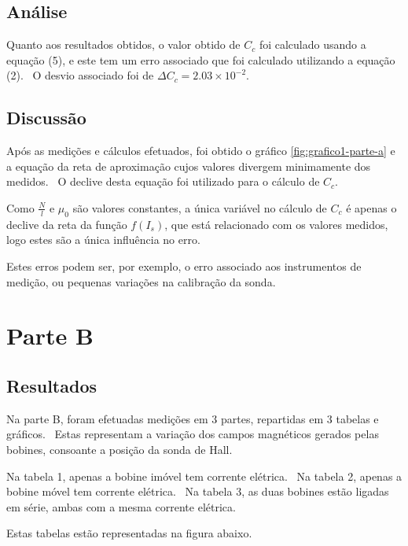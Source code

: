 {\subsection{Análise} \label{subsec:analise-discussao-parte1-analise}
    Quanto aos resultados obtidos, o valor obtido de $C_c$ foi calculado usando a equação (5), e este tem um erro associado que foi calculado utilizando a equação (2). \ O desvio associado foi de $\Delta C_c = 2.03 \times 10^{-2}$.

\subsection{Discussão}
    Após as medições e cálculos efetuados, foi obtido o gráfico \ref{fig:grafico1-parte-a} e a equação da reta de aproximação cujos valores divergem minimamente dos medidos. \ O declive desta equação foi utilizado para o cálculo de $C_c$. 
    \par Como $\frac{N}{l}$ e $\mu_0$ são valores constantes, a única variável no cálculo de $C_c$ é apenas o declive da reta da função $f(I_s)$, que está relacionado com os valores medidos, logo estes são a única influência no erro.
    \par Estes erros podem ser, por exemplo, o erro associado aos instrumentos de medição, ou pequenas variações na calibração da sonda.
    
\pagebreak

\section{Parte B}
\label{sec:analise-discussao-parte2}

\subsection{Resultados}
\label{subsec:analise-discussao-parte2-resultados}
    Na parte B, foram efetuadas medições em 3 partes, repartidas em 3 tabelas e gráficos. \ Estas representam a variação dos campos magnéticos gerados pelas bobines, consoante a posição da sonda de Hall.
    \par Na tabela 1, apenas a bobine imóvel tem corrente elétrica. \ Na tabela 2, apenas a bobine móvel tem corrente elétrica. \ Na tabela 3, as duas bobines estão ligadas em série, ambas com a mesma corrente elétrica. 
    \par Estas tabelas estão representadas na figura abaixo. 

}
